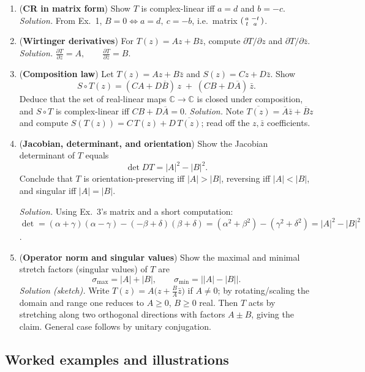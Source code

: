 \documentclass[11pt,a4paper]{article}
\theoremstyle{definition}
\theoremstyle{definition}
\theoremstyle{plain}
\theoremstyle{remark}
\begin{document}
\begin{enumerate}
	\item (\textbf{CR in matrix form})  
	Show $T$ is complex-linear iff $a=d$ and $b=-c$.  
	\emph{Solution.} From Ex.\ 1, $B=0\iff a=d,\ c=-b$, i.e.\ matrix $\begin{psmallmatrix}a&-t\\ t&a\end{psmallmatrix}$.
	
	\item (\textbf{Wirtinger derivatives})  
	For $T(z)=Az+B\bar z$, compute $\partial T/\partial z$ and $\partial T/\partial\bar z$.  
	\emph{Solution.} $\displaystyle \frac{\partial T}{\partial z}=A,\qquad \frac{\partial T}{\partial\bar z}=B$.
	
	\item (\textbf{Composition law})  
	Let $T(z)=Az+B\bar z$ and $S(z)=Cz+D\bar z$. Show
	\[
	S\circ T(z)=(CA+D\overline{B})\,z\;+\;(CB+D\overline{A})\,\bar z.
	\]
	Deduce that the set of real-linear maps $\mathbb{C}\to\mathbb{C}$ is closed under composition, and $S\circ T$ is complex-linear iff $CB+D\overline{A}=0$.
	\emph{Solution.} Note $\overline{T(z)}=\overline{A}\bar z+\overline{B}z$ and compute
	$S(T(z))=C\,T(z)+D\,\overline{T(z)}$; read off the $z,\bar z$ coefficients.
	
	\item (\textbf{Jacobian, determinant, and orientation})  
	Show the Jacobian determinant of $T$ equals
	\[
	\det DT=|A|^2-|B|^2.
	\]
	Conclude that $T$ is orientation-preserving iff $|A|>|B|$, reversing iff $|A|<|B|$, and singular iff $|A|=|B|$.
	
	\emph{Solution.} Using Ex.\ 3’s matrix and a short computation:
	$\det=\!(\alpha+\gamma)(\alpha-\gamma)-(-\beta+\delta)(\beta+\delta)
	=(\alpha^2+\beta^2)-(\gamma^2+\delta^2)=|A|^2-|B|^2$.
	
	\item (\textbf{Operator norm and singular values})  
	Show the maximal and minimal stretch factors (singular values) of $T$ are
	\[
	\sigma_{\max}=|A|+|B|,\qquad \sigma_{\min}=\bigl||A|-|B|\bigr|.
	\]
	\emph{Solution (sketch).} Write $T(z)=A\bigl(z+\tfrac{B}{A}\bar z\bigr)$ if $A\neq0$; by rotating/scaling the domain and range one reduces to $A\ge0$, $B\ge0$ real. Then $T$ acts by stretching along two orthogonal directions with factors $A\pm B$, giving the claim. General case follows by unitary conjugation.
\end{enumerate}

\subsection*{Worked examples and illustrations}
\end{document}
